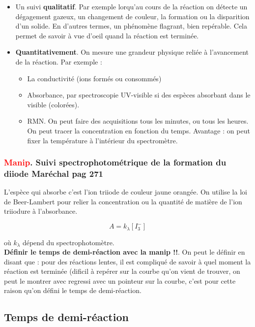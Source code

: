 \documentclass{article}
\begin{document}
\begin{itemize}
    \item Un suivi \textbf{qualitatif}. Par exemple lorqu'au cours de la réaction on détecte un dégagement gazeux, un changement de couleur, la formation ou la disparition d'un solide. En d'autres termes, un phénomène flagrant, bien repérable. Cela permet de savoir à vue d'oeil quand la réaction est terminée.
    \item \textbf{Quantitativement}. On mesure une grandeur physique reliée à l'avancement de la réaction. Par exemple :
    \begin{itemize}
        \item La conductivité (ions formés ou consommés)
        \item Absorbance, par spectroscopie UV-visible si des espèces absorbant dans le visible (colorées).
        \item RMN. On peut faire des acquisitions tous les minutes, ou tous les heures. On peut tracer la concentration en fonction du temps. Avantage : on peut fixer la température à l'intérieur du spectromètre.
    \end{itemize}
\end{itemize}

\subsubsection*{\textcolor{red}{Manip}. Suivi spectrophotométrique de la formation du diiode Maréchal pag 271}

L'espèce qui absorbe c'est l'ion triiode de couleur jaune orangée. On utilise la loi de Beer-Lambert pour relier la concentration ou la quantité de matière de l'ion triiodure à l'absorbance.

\begin{equation}
    A = k_{\lambda}[I_3^-]
\end{equation}

où $k_{\lambda}$ dépend du spectrophotomètre.\\

\textbf{Définir le temps de demi-réaction avec la manip !!}. On peut le définir en disant que : pour des réactions lentes, il est compliqué de savoir à quel moment la réaction est terminée (dificil à repérer sur la courbe qu'on vient de trouver, on peut le montrer avec regressi avec un pointeur sur la courbe, c'est pour cette raison qu'on défini le temps de demi-réaction.

\subsection{Temps de demi-réaction}
\end{document}
